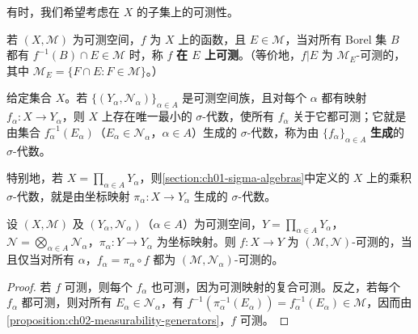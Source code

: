 \documentclass[../../main.tex]{subfiles}%
\begin{document}
有时，我们希望考虑在 $X$ 的子集上的可测性。
\begin{definition}[在子集上可测]\label{definition:ch02-measurable-on-subset}
若 $(X,\mathscr{M})$ 为可测空间，$f$ 为 $X$ 上的函数，且 $E\in\mathscr{M}$，当对所有 Borel 集 $B$ 都有 $f^{-1}(B)\cap E\in\mathscr{M}$ 时，称 $f$ \textbf{在 $E$ 上可测}。（等价地，$f|E$ 为 $\mathscr{M}_E$-可测的，其中 $\mathscr{M}_E=\{F\cap E:F\in\mathscr{M}\}$。）
\end{definition}

\begin{definition}\label{definition:ch02-mapping-generated-sigma}
给定集合 $X$。若 $\{(Y_\alpha,\mathscr{N}_\alpha)\}_{\alpha\in A}$ 是可测空间族，且对每个 $\alpha$ 都有映射 $f_\alpha:X\to Y_\alpha$，则 $X$ 上存在唯一最小的 $\sigma$-代数，使所有 $f_\alpha$ 关于它都可测；它就是由集合 $f_\alpha^{-1}(E_\alpha)$（$E_\alpha\in\mathscr{N}_\alpha$，$\alpha\in A$）生成的 $\sigma$-代数，称为由 $\{f_\alpha\}_{\alpha\in A}$ \textbf{生成}的 $\sigma$-代数。
\end{definition}
\begin{remark}
特别地，若 $X=\prod_{\alpha\in A}Y_\alpha$，则\cref{section:ch01-sigma-algebras}中定义的 $X$ 上的乘积 $\sigma$-代数，就是由坐标映射 $\pi_\alpha:X\to Y_\alpha$ 生成的 $\sigma$-代数。
\end{remark}

\begin{proposition}\label{proposition:ch02-coordinate-measurability}
设 $(X,\mathscr{M})$ 及 $(Y_\alpha,\mathscr{N}_\alpha)$（$\alpha\in A$）为可测空间，$Y=\prod_{\alpha\in A}Y_\alpha$，$\mathscr{N}=\bigotimes_{\alpha\in A}\mathscr{N}_\alpha$，$\pi_\alpha:Y\to Y_\alpha$ 为坐标映射。则 $f:X\to Y$ 为 $(\mathscr{M},\mathscr{N})$-可测的，当且仅当对所有 $\alpha$，$f_\alpha=\pi_\alpha\circ f$ 都为 $(\mathscr{M},\mathscr{N}_\alpha)$-可测的。
\end{proposition}
\begin{proof}
若 $f$ 可测，则每个 $f_\alpha$ 也可测，因为可测映射的复合可测。反之，若每个 $f_\alpha$ 都可测，则对所有 $E_\alpha\in\mathscr{N}_\alpha$，有 $f^{-1}(\pi_\alpha^{-1}(E_\alpha))=f_\alpha^{-1}(E_\alpha)\in\mathscr{M}$，因而由\cref{proposition:ch02-measurability-generators}，$f$ 可测。
\end{proof}
\end{document}
